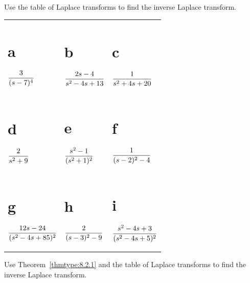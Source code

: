 \begin{exerciselist}
  \item\label{exer:8.2.1} Use the table of Laplace transforms to find the inverse Laplace transform.

  \begin{tabular}[t]{@{}p{112pt}@{}p{112pt}@{}p{112pt}}
    \part{a} $\displaystyle\frac{3}{(s-7)^{4}}$              & \part{b} $\displaystyle\frac{2s-4}{s^{2}-4s+13}$      & \part{c} $\displaystyle\frac{1}{s^{2}+4s+20}$               \\[10pt]
    \part{d} $\displaystyle\frac{2}{s^{2}+9}$                & \part{e} $\displaystyle\frac{s^{2}-1}{(s^{2}+1)^{2}}$ & \part{f} $\displaystyle\frac{1}{(s-2)^{2}-4}$               \\[10pt]
    \part{g} $\displaystyle\frac{12s-24}{(s^{2}-4s+85)^{2}}$ & \part{h} $\displaystyle\frac{2}{(s-3)^{2}-9}$         & \part{i} $\displaystyle\frac{s^{2}-4s+3}{(s^{2}-4s+5)^{2}}$
  \end{tabular}

  \item\label{exer:8.2.2} Use Theorem~\ref{thmtype:8.2.1} and the table of Laplace transforms to
        find the inverse Laplace transform.


\end{exerciselist}
